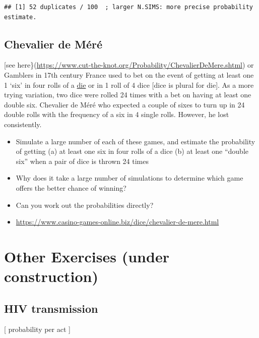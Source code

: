 \documentclass[]{book}
\begin{document}
\begin{verbatim}
## [1] 52 duplicates / 100  ; larger N.SIMS: more precise probability estimate.
\end{verbatim}

\hypertarget{chevalier-de-muxe9ruxe9}{%
\subsection{Chevalier de Méré}\label{chevalier-de-muxe9ruxe9}}

{[}see here\}(\url{https://www.cut-the-knot.org/Probability/ChevalierDeMere.shtml}) or\\
Gamblers in 17th century France used to bet on the event of getting at least one 1 `six' in four rolls of a \href{https://en.wikipedia.org/wiki/Dice}{die} or in 1 roll of 4 dice {[}dice is plural for die{]}. As a more trying variation, two dice were rolled 24 times with a bet on having at least one double six. Chevalier de Méré who expected a couple of sixes to turn up in 24 double rolls with the frequency of a six in 4 single rolls. However, he lost consistently.

\begin{itemize}
\item
  Simulate a large number of each of these games, and estimate the probability of getting (a) at least one six in four rolls of a dice (b) at least one ``double six'' when a pair of dice is thrown 24 times
\item
  Why does it take a large number of simulations to determine which game offers the better chance of winning?
\item
  Can you work out the probabilities directly?
\item
  \url{https://www.casino-games-online.biz/dice/chevalier-de-mere.html}
\end{itemize}

\hypertarget{other-exercises-under-construction}{%
\section{Other Exercises (under construction)}\label{other-exercises-under-construction}}

\hypertarget{hiv-transmission}{%
\subsection{HIV transmission}\label{hiv-transmission}}

{[} probability per act {]}
\end{document}
